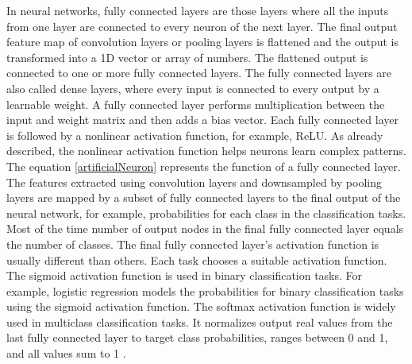 In neural networks, fully connected layers are those layers where all the inputs from one layer are connected to every neuron of the next layer. The final output feature map of convolution layers or pooling layers is flattened and the output is transformed into a \ac{1D} vector or array of numbers. The flattened output is connected to one or more fully connected layers. The fully connected layers are also called dense layers, where every input is connected to every output by a learnable weight. A fully connected layer performs multiplication between the input and weight matrix and then adds a bias vector. Each fully connected layer is followed by a nonlinear activation function, for example, ReLU. As already described, the nonlinear activation function helps neurons learn complex patterns. The equation \ref{artificialNeuron} represents the function of a fully connected layer. The features extracted using convolution layers and downsampled by pooling layers are mapped by a subset of fully connected layers to the final output of the neural network, for example, probabilities for each class in the classification tasks. Most of the time number of output nodes in the final fully connected layer equals the number of classes. The final fully connected layer's activation function is usually different than others. Each task chooses a suitable activation function. The sigmoid activation function is used in binary classification tasks. For example, logistic regression models the probabilities for binary classification tasks using the sigmoid activation function. The softmax activation function is widely used in multiclass classification tasks. It normalizes output real values from the last fully connected layer to target class probabilities, ranges between 0 and 1, and all values sum to 1 \cite{articleCNNs}.





